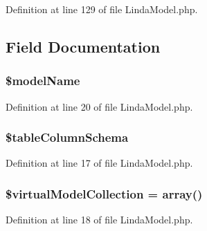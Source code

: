 Definition at line 129 of file Linda\+Model.\+php.



\subsection{Field Documentation}
\hypertarget{class_linda_model_ac2d5e104b8970095b9463776a94eede0}{}
\subsubsection[{\$model\+Name}]{\setlength{\rightskip}{0pt plus 5cm}\$model\+Name\hspace{0.3cm}{\ttfamily [protected]}}\label{class_linda_model_ac2d5e104b8970095b9463776a94eede0}


Definition at line 20 of file Linda\+Model.\+php.

\hypertarget{class_linda_model_a736ca8a8aaf094b1747b04f00333732c}{}
\subsubsection[{\$table\+Column\+Schema}]{\setlength{\rightskip}{0pt plus 5cm}\$table\+Column\+Schema\hspace{0.3cm}{\ttfamily [protected]}}\label{class_linda_model_a736ca8a8aaf094b1747b04f00333732c}


Definition at line 17 of file Linda\+Model.\+php.

\hypertarget{class_linda_model_a1b40070fc765a8a4f2af137240160b50}{}
\subsubsection[{\$virtual\+Model\+Collection}]{\setlength{\rightskip}{0pt plus 5cm}\$virtual\+Model\+Collection = array()\hspace{0.3cm}{\ttfamily [protected]}}\label{class_linda_model_a1b40070fc765a8a4f2af137240160b50}


Definition at line 18 of file Linda\+Model.\+php.

